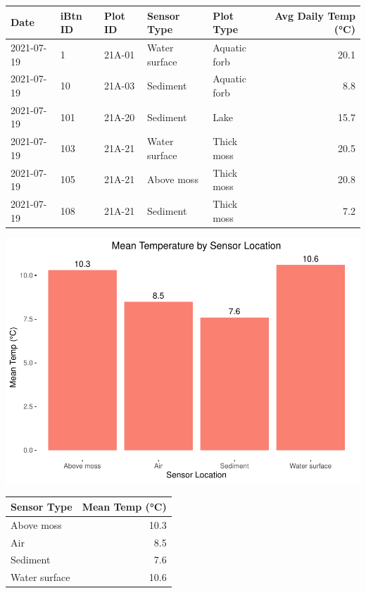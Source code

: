 \documentclass[
]{article}
\begin{document}
\begin{longtable}[]{@{}lllllr@{}}
\toprule
Date & iBtn ID & Plot ID & Sensor Type & Plot Type & Avg Daily Temp
(°C) \\
\midrule
\endhead
2021-07-19 & 1 & 21A-01 & Water surface & Aquatic forb & 20.1 \\
2021-07-19 & 10 & 21A-03 & Sediment & Aquatic forb & 8.8 \\
2021-07-19 & 101 & 21A-20 & Sediment & Lake & 15.7 \\
2021-07-19 & 103 & 21A-21 & Water surface & Thick moss & 20.5 \\
2021-07-19 & 105 & 21A-21 & Above moss & Thick moss & 20.8 \\
2021-07-19 & 108 & 21A-21 & Sediment & Thick moss & 7.2 \\
\bottomrule
\end{longtable}

\includegraphics{iButtons2022-2-17_files/figure-latex/unnamed-chunk-11-1.pdf}

\begin{longtable}[]{@{}lr@{}}
\toprule
Sensor Type & Mean Temp (°C) \\
\midrule
\endhead
Above moss & 10.3 \\
Air & 8.5 \\
Sediment & 7.6 \\
Water surface & 10.6 \\
\bottomrule
\end{longtable}
\end{document}
